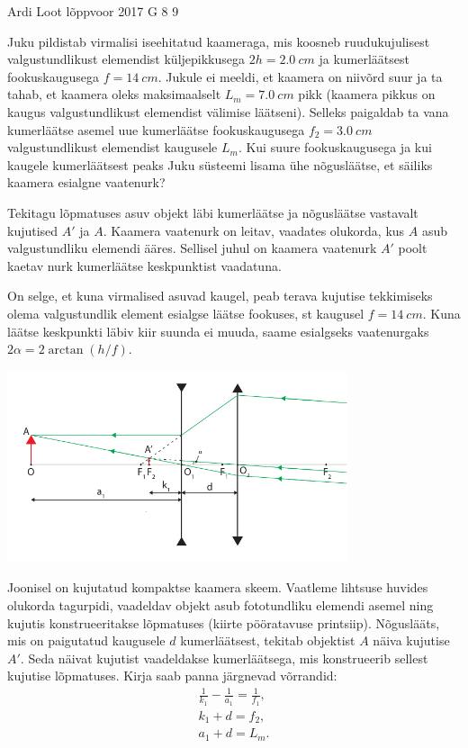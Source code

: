 {Ardi Loot} %
{lõppvoor} %
{2017} %
{G 8} %
{9} %
{
\ifStatement
Juku pildistab virmalisi iseehitatud kaameraga, mis koosneb ruudukujulisest
valgustundlikust elemendist küljepikkusega $2h=\SI{2.0}{cm}$ ja kumerläätsest
fookuskaugusega $f=\SI{14}{cm}.$ Jukule ei meeldi, et kaamera on
niivõrd suur ja ta tahab, et kaamera oleks maksimaalselt $L_{m}=\SI{7.0}{cm}$
pikk (kaamera pikkus on kaugus valgustundlikust elemendist välimise läätseni).
Selleks paigaldab ta vana kumerläätse asemel uue kumerläätse fookuskaugusega $f_{2}=\SI{3.0}{cm}$
valgustundlikust elemendist kaugusele $L_{m}.$ Kui suure fookuskaugusega
ja kui kaugele kumerläätsest peaks Juku süsteemi
lisama ühe nõgusläätse, et säiliks kaamera esialgne vaatenurk?
\fi


\ifHint
Tekitagu lõpmatuses asuv objekt läbi kumerläätse ja nõgusläätse vastavalt kujutised $A'$ ja $A$. Kaamera vaatenurk on leitav, vaadates olukorda, kus $A$ asub valgustundliku elemendi ääres. Sellisel juhul on kaamera vaatenurk $A'$ poolt kaetav nurk kumerläätse keskpunktist vaadatuna.
\fi


\ifSolution
On selge, et kuna virmalised asuvad kaugel, peab terava kujutise
tekkimiseks olema valgustundlik element esialgse läätse fookuses,
st kaugusel $f=\SI{14}{cm}.$ Kuna läätse keskpunkti läbiv kiir suunda
ei muuda, saame esialgseks vaatenurgaks $2\alpha=2\arctan\left(h/f\right).$

\begin{center}
	\includegraphics[width=10cm]{2017-v3g-08-skeem__telephoto.pdf}
\end{center}
Joonisel on kujutatud kompaktse kaamera skeem. Vaatleme lihtsuse huvides
olukorda tagurpidi, vaadeldav objekt asub fototundliku elemendi asemel
ning kujutis konstrueeritakse lõpmatuses (kiirte pööratavuse printsiip).
Nõguslääts, mis on paigutatud kaugusele $d$ kumerläätsest, tekitab
objektist $A$ näiva kujutise $A'$. Seda näivat kujutist vaadeldakse
kumerläätsega, mis konstrueerib sellest kujutise lõpmatuses. Kirja
saab panna järgnevad võrrandid:
\begin{eqnarray}
\frac{1}{k_{1}}-\frac{1}{a_{1}} = \frac{1}{f_{1}}, \label{2017-v3g-08-eq:telelens-eq1}\\
k_{1}+d = f_{2},\\
a_{1}+d = L_{m}.
\end{eqnarray}

}
